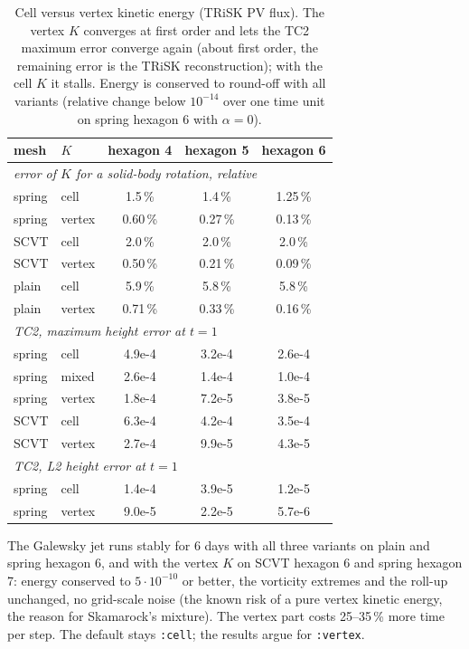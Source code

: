 \documentclass[11pt,a4paper]{article}
\newcommand{\code}[1]{\texttt{#1}}
\begin{document}
\begin{table}[ht]
\centering
\begin{tabular}{llccc}
\toprule
mesh & $K$ & hexagon 4 & hexagon 5 & hexagon 6\\
\midrule
\multicolumn{5}{l}{\emph{error of $K$ for a solid-body rotation, relative}}\\
spring & cell & 1.5\,\% & 1.4\,\% & 1.25\,\%\\
spring & vertex & 0.60\,\% & 0.27\,\% & 0.13\,\%\\
SCVT & cell & 2.0\,\% & 2.0\,\% & 2.0\,\%\\
SCVT & vertex & 0.50\,\% & 0.21\,\% & 0.09\,\%\\
plain & cell & 5.9\,\% & 5.8\,\% & 5.8\,\%\\
plain & vertex & 0.71\,\% & 0.33\,\% & 0.16\,\%\\
\midrule
\multicolumn{5}{l}{\emph{TC2, maximum height error at $t=1$}}\\
spring & cell & 4.9e-4 & 3.2e-4 & 2.6e-4\\
spring & mixed & 2.6e-4 & 1.4e-4 & 1.0e-4\\
spring & vertex & 1.8e-4 & 7.2e-5 & 3.8e-5\\
SCVT & cell & 6.3e-4 & 4.2e-4 & 3.5e-4\\
SCVT & vertex & 2.7e-4 & 9.9e-5 & 4.3e-5\\
\midrule
\multicolumn{5}{l}{\emph{TC2, L2 height error at $t=1$}}\\
spring & cell & 1.4e-4 & 3.9e-5 & 1.2e-5\\
spring & vertex & 9.0e-5 & 2.2e-5 & 5.7e-6\\
\bottomrule
\end{tabular}
\caption{Cell versus vertex kinetic energy (TRiSK PV flux). The vertex $K$
converges at first order and lets the TC2 maximum error converge again
(about first order, the remaining error is the TRiSK reconstruction); with the
cell $K$ it stalls. Energy is conserved to round-off with all variants
(relative change below $10^{-14}$ over one time unit on spring hexagon 6 with $\alpha = 0$).}
\end{table}

The Galewsky jet runs stably for 6 days with all three variants on plain and
spring hexagon 6, and with the vertex $K$ on SCVT hexagon 6 and spring hexagon 7:
energy conserved to $5\cdot10^{-10}$ or better, the vorticity extremes and the roll-up
unchanged, no grid-scale noise (the known risk of a pure vertex kinetic energy, the
reason for Skamarock's mixture). The vertex part costs 25--35\,\% more time per
step. The default stays \code{:cell}; the results argue for \code{:vertex}.
\end{document}
